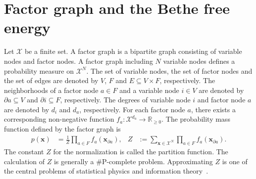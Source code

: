 \documentclass[a4paper,10pt,twoside,twocolumn,openany,final]{memoir}
\theoremstyle{plain}
\theoremstyle{definition}
\theoremstyle{remark}
\begin{document}
\section{Factor graph and the Bethe free energy}
Let $\mathcal{X}$ be a finite set.
A factor graph is a bipartite graph consisting of variable nodes and factor nodes.
A factor graph including $N$ variable nodes defines a probability measure on $\mathcal{X}^N$.
The set of variable nodes, the set of factor nodes and the set of edges are denoted by $V$, $F$ and $E\subseteq V\times F$, respectively.
The neighborhoods of a factor node $a\in F$ and a variable node $i\in V$ are denoted by $\partial a \subseteq V$ and $\partial i \subseteq F$, respectively.
The degrees of variable node $i$ and factor node $a$ are denoted by $d_i$ and $d_a$, respectively.
For each factor node $a$, there exists a corresponding non-negative function $f_a: \mathcal{X}^{d_a}\to \mathbb{R}_{\ge 0}$.
The probability mass function defined by the factor graph is
\begin{align*}
p(\bm{x}) &= \frac1Z \prod_{a\in F} f_a(\bm{x}_{\partial a}),&
Z &:= \sum_{\bm{x}\in\mathcal{X}^N} \prod_{a\in F} f_a(\bm{x}_{\partial a}).
\end{align*}
The constant $Z$ for the normalization is called the {partition function}.
The calculation of $Z$ is generally a \#P-complete problem.
Approximating $Z$ is one of the central problems of statistical physics and information theory~\cite{mezard2009information}.
\end{document}
